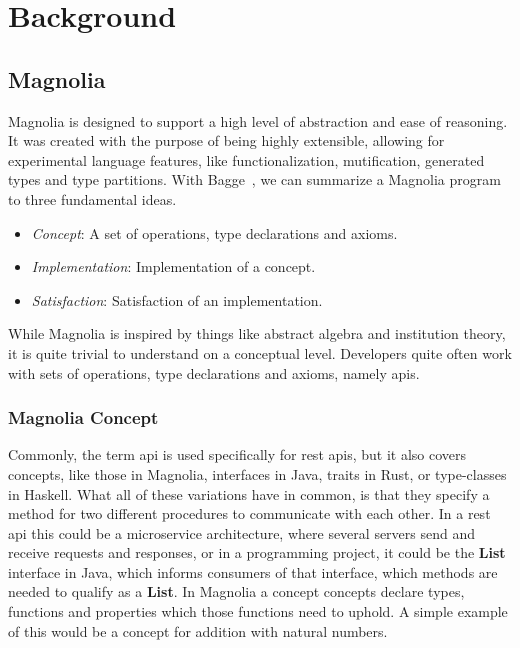 \chapter{Background} \label{cha:background}

\section{Magnolia}

Magnolia is designed to support a high level of abstraction and ease of
reasoning. It was created with the purpose of being highly extensible,
allowing for experimental language features, like functionalization,
mutification, generated types and type partitions. With Bagge~\cite{baggeThesis},
we can summarize a Magnolia program to three fundamental ideas.

\begin{itemize}
  \item \textit{Concept}: A set of operations, type declarations and axioms.
  \item \textit{Implementation}: Implementation of a concept.
  \item \textit{Satisfaction}: Satisfaction of an implementation.
\end{itemize}

While Magnolia is inspired by things like abstract algebra and institution
theory, it is quite trivial to understand on a conceptual level. Developers quite
often work with sets of operations, type declarations and axioms, namely
\gls*{api}s.

\subsection{Magnolia Concept}

Commonly, the term \gls*{api} is used specifically for \gls*{rest} \gls*{api}s, but
it also covers concepts, like those in Magnolia, interfaces in Java, traits in
Rust, or type-classes in Haskell. What all of these variations have in common, 
is that they specify a method for two different procedures to communicate with 
each other. In a \gls*{rest} \gls*{api} this could be a microservice architecture,
where several servers send and receive requests and responses, or in a 
programming project, it could be the \textbf{List} interface in Java, which 
informs consumers of that interface, which methods are needed to qualify as a
\textbf{List}. In Magnolia a concept concepts declare types, functions and 
properties which those functions need to uphold. A simple example of this 
would be a concept for addition with natural numbers.

